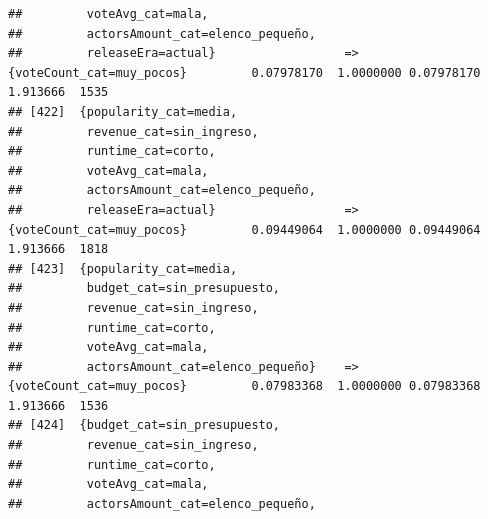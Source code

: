 \documentclass[
]{article}
\begin{document}
\begin{verbatim}
##         voteAvg_cat=mala,                                                                                                       
##         actorsAmount_cat=elenco_pequeño,                                                                                        
##         releaseEra=actual}                  => {voteCount_cat=muy_pocos}         0.07978170  1.0000000 0.07978170 1.913666  1535
## [422]  {popularity_cat=media,                                                                                                   
##         revenue_cat=sin_ingreso,                                                                                                
##         runtime_cat=corto,                                                                                                      
##         voteAvg_cat=mala,                                                                                                       
##         actorsAmount_cat=elenco_pequeño,                                                                                        
##         releaseEra=actual}                  => {voteCount_cat=muy_pocos}         0.09449064  1.0000000 0.09449064 1.913666  1818
## [423]  {popularity_cat=media,                                                                                                   
##         budget_cat=sin_presupuesto,                                                                                             
##         revenue_cat=sin_ingreso,                                                                                                
##         runtime_cat=corto,                                                                                                      
##         voteAvg_cat=mala,                                                                                                       
##         actorsAmount_cat=elenco_pequeño}    => {voteCount_cat=muy_pocos}         0.07983368  1.0000000 0.07983368 1.913666  1536
## [424]  {budget_cat=sin_presupuesto,                                                                                             
##         revenue_cat=sin_ingreso,                                                                                                
##         runtime_cat=corto,                                                                                                      
##         voteAvg_cat=mala,                                                                                                       
##         actorsAmount_cat=elenco_pequeño,                                                                                        

\end{verbatim}
\end{document}
